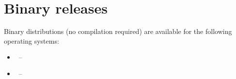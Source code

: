 %
%
%


\chapter{Binary releases}\label{chap:bin}

Binary distributions (no compilation required) are available for the following operating systems:
\begin{itemize}
 \item \linux~-- 
 \item \macosx~-- 
\end{itemize}


